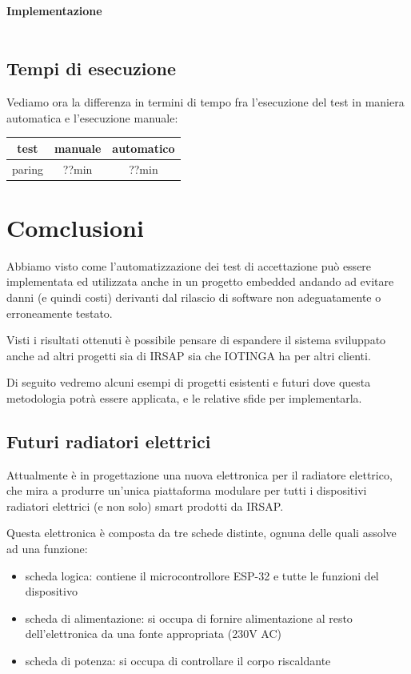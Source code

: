 \documentclass[12pt,a4paper,twoside,titlepage]{book}
\begin{document}
\subsubsection{Implementazione}
\inputminted{python3}{src/offline_working.py}

\section{Tempi di esecuzione}

Vediamo ora la differenza in termini di tempo fra l'esecuzione del test in maniera automatica 
e l'esecuzione manuale:

\begin{center}
\begin{tabular}{| c | c | c |}
    \hline
    \textbf{test} & \textbf{manuale} & \textbf{automatico} \\ \hline
    paring & ??min & ??min \\ \hline 
\end{tabular}
\end{center}

\chapter{Comclusioni}

Abbiamo visto come l'automatizzazione dei test di accettazione può essere implementata
ed utilizzata anche in un progetto embedded andando ad evitare danni (e quindi costi)
derivanti dal rilascio di software non adeguatamente o erroneamente testato.

Visti i risultati ottenuti è possibile pensare di espandere il sistema sviluppato
anche ad altri progetti sia di IRSAP sia che IOTINGA ha per altri clienti.

Di seguito vedremo alcuni esempi di progetti esistenti e futuri dove questa metodologia
potrà essere applicata, e le relative sfide per implementarla.

\section{Futuri radiatori elettrici}

Attualmente è in progettazione una nuova elettronica per il radiatore elettrico,
che mira a produrre un'unica piattaforma modulare per tutti i dispositivi radiatori elettrici
(e non solo) smart prodotti da IRSAP.

Questa elettronica è composta da tre schede distinte, ognuna delle quali assolve
ad una funzione:
\begin{itemize}
    \item scheda logica: contiene il microcontrollore ESP-32 e tutte le funzioni del dispositivo
    \item scheda di alimentazione: si occupa di fornire alimentazione al resto dell'elettronica
        da una fonte appropriata (230V AC)
    \item scheda di potenza: si occupa di controllare il corpo riscaldante
\end{itemize}
\end{document}
